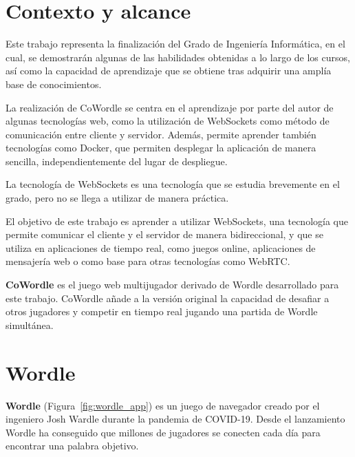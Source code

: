 \section{Contexto y alcance}

Este trabajo representa la finalización del Grado de Ingeniería Informática, en el cual, se demostrarán algunas de las habilidades obtenidas a lo largo de los cursos, así como la capacidad de aprendizaje que se obtiene tras adquirir una amplía base de conocimientos.

La realización de CoWordle se centra en el aprendizaje por parte del autor de algunas tecnologías web, como la utilización de WebSockets como método de comunicación entre cliente y servidor.  Además, permite aprender también tecnologías como Docker, que permiten desplegar la aplicación de manera sencilla, independientemente del lugar de despliegue.

La tecnología de WebSockets es una tecnología que se estudia brevemente en el grado, pero no se llega a utilizar de manera práctica.

El objetivo de este trabajo es aprender a utilizar WebSockets, una tecnología que permite comunicar el cliente y el servidor de manera bidireccional, y que se utiliza en aplicaciones de tiempo real, como juegos online, aplicaciones de mensajería web o como base para otras tecnologías como WebRTC.

\textbf{CoWordle} es el juego web multijugador derivado de Wordle desarrollado para este trabajo. CoWordle añade a la versión original la capacidad de desafiar a otros jugadores y competir en tiempo real jugando una partida de Wordle simultánea.


\section{Wordle}

\textbf{Wordle} (Figura~\ref{fig:wordle_app}) es un juego de navegador creado por el ingeniero Josh Wardle durante la pandemia de COVID-19. Desde el lanzamiento Wordle ha conseguido que millones de jugadores se conecten cada día para encontrar una palabra objetivo.

